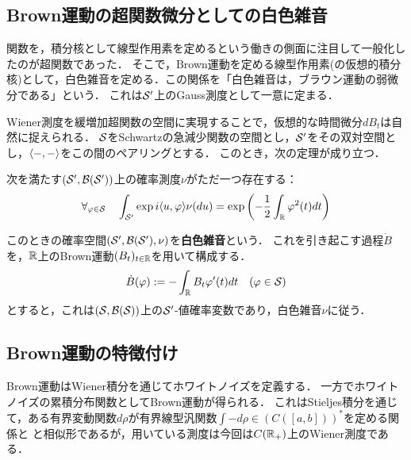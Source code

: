 \documentclass[uplatex,dvipdfmx]{jsreport}
\begin{document}
\subsection{Brown運動の超関数微分としての白色雑音}

\begin{tcolorbox}[colframe=ForestGreen, colback=ForestGreen!10!white,breakable,colbacktitle=ForestGreen!40!white,coltitle=black,fonttitle=\bfseries\sffamily,
title=]
    関数を，積分核として線型作用素を定めるという働きの側面に注目して一般化したのが超関数であった．
    そこで，Brown運動を定める線型作用素(の仮想的積分核)として，白色雑音を定める．この関係を「白色雑音は，ブラウン運動の弱微分である」という．
    これは$\S'$上のGauss測度として一意に定まる．
\end{tcolorbox}

\begin{discussion}
    Wiener測度を緩増加超関数の空間に実現することで，仮想的な時間微分$dB_t$は自然に捉えられる．
    $\S$をSchwartzの急減少関数の空間とし，$\S'$をその双対空間とし，$\brac{-,-}$をこの間のペアリングとする．
    このとき，次の定理が成り立つ．
    \begin{theorem}
        次を満たす$(\S',\B(\S'))$上の確率測度$\nu$がただ一つ存在する：
        \[\forall_{\varphi\in\S}\quad\int_{\S'}\exp{i\brac{u,\varphi}}\nu(du)=\exp\paren{-\frac{1}{2}\int_\R\varphi^2(t)dt}\]
    \end{theorem}
    このときの確率空間$(\S',\B(\S'),\nu)$を\textbf{白色雑音}という．
    これを引き起こす過程$\dot{B}$を，$\R$上のBrown運動$(B_t)_{t\in\R}$を用いて構成する．
    \[\dot{B}(\varphi):=-\int_\R B_t\varphi'(t)dt\quad(\varphi\in\S)\]
    とすると，これは$(\S,\B(\S))$上の$\S'$-値確率変数であり，白色雑音$\nu$に従う．
\end{discussion}

\subsection{Brown運動の特徴付け}

\begin{tcolorbox}[colframe=ForestGreen, colback=ForestGreen!10!white,breakable,colbacktitle=ForestGreen!40!white,coltitle=black,fonttitle=\bfseries\sffamily,
title=]
    Brown運動はWiener積分を通じてホワイトノイズを定義する．
    一方でホワイトノイズの累積分布関数としてBrown運動が得られる．
    これはStieljes積分を通じて，ある有界変動関数$d\rho$が有界線型汎関数$\int-d\rho\in (C([a,b]))^*$を定める関係と
    と相似形であるが，用いている測度は今回は$C(\R_+)$上のWiener測度である．
\end{tcolorbox}
\end{document}
